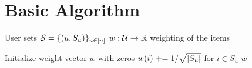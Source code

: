 \section{Basic Algorithm}

\begin{algorithm}[ht]
\caption{\basicalgo
  User sets $\mathcal{S} = \{(u, S_u)\}_{u \in [n]}$
  $w: \mathcal{U} \to \mathbb{R}$ weighting of the items
}
\begin{algorithmic}[1]
\label{alg:basic}
\STATE Initialize weight vector $w$ with zeros
    \STATE $w(i) \mathrel{+}= 1/\sqrt{|S_u|}$ for $i \in S_u$ 
\ENDFOR
\RETURN $w$
\end{algorithmic}
\end{algorithm}